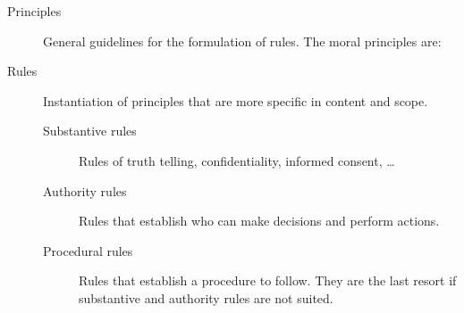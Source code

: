 \begin{description}
    \item[Principles] 
        General guidelines for the formulation of rules. The moral principles are: 

    \item[Rules] 
        Instantiation of principles that are more specific in content and scope.

        \begin{description}
            \item[Substantive rules] 
                Rules of truth telling, confidentiality, informed consent, \dots

            \item[Authority rules] 
                Rules that establish who can make decisions and perform actions.

            \item[Procedural rules] 
                Rules that establish a procedure to follow. They are the last resort if substantive and authority rules are not suited.
        \end{description}
\end{description}